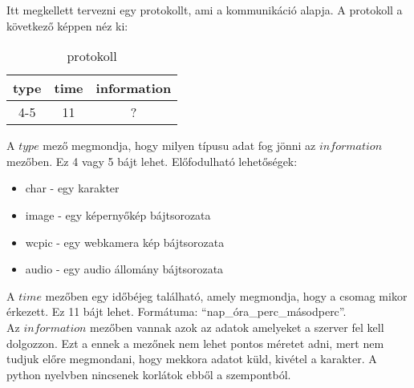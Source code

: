 \documentclass[a4paper, 11pt]{article}
\begin{document}

Itt megkellett tervezni egy protokollt, ami a kommunikáció alapja. A protokoll a következő képpen néz ki:
\begin{table}[H]
\centering
\label{tab:protocol}
\caption{protokoll}
\begin{tabular}{|c|c|c|}
\hline
\textbf{type} & \textbf{time} & \textbf{information} \\
\hline
4-5 & 11 & ? \\
\hline
\end{tabular}
\end{table}
A $type$ mező megmondja, hogy milyen típusu adat fog jönni az $information$ mezőben. Ez 4 vagy 5 bájt lehet. Előfodulható lehetőségek:
\begin{itemize}
\item char - egy karakter
\item image - egy képernyőkép bájtsorozata
\item wcpic - egy webkamera kép bájtsorozata
\item audio - egy audio állomány bájtsorozata
\end{itemize}
A $time$ mezőben egy időbéjeg található, amely megmondja, hogy a csomag mikor érkezett. Ez 11 bájt lehet. Formátuma: ``nap\_óra\_perc\_másodperc''.\\
Az $information$ mezőben vannak azok az adatok amelyeket a szerver fel kell dolgozzon. Ezt a ennek a mezőnek nem lehet pontos méretet adni, mert nem tudjuk előre megmondani, hogy mekkora adatot küld, kivétel a karakter. A python nyelvben nincsenek korlátok ebből a szempontból.
\end{document}
